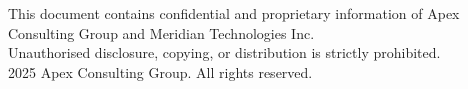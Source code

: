 \vspace{10pt}

\begin{center}
{\scriptsize\color{MidGrey}
  This document contains confidential and proprietary information of Apex Consulting Group
  and Meridian Technologies Inc.\\
  Unauthorised disclosure, copying, or distribution is strictly prohibited.\\[4pt]
  \textcopyright{} 2025 Apex Consulting Group. All rights reserved.
}
\end{center}
